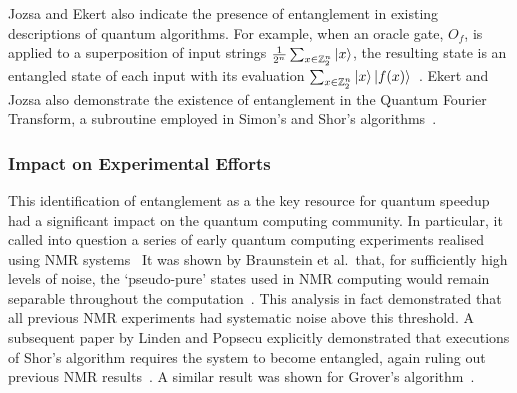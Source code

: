 \documentclass{standalone}
\begin{document}
\par
Jozsa and Ekert also indicate the presence of entanglement in existing descriptions of quantum algorithms. For example, when an oracle gate, $O_{f}$, is applied to a superposition of input strings $\frac{1}{2^{n}}\sum_{x\in\mathbb{Z}_{2}^{n}}\ket{x}$, the resulting state is an entangled state of each input with its evaluation $\sum_{x\in\mathbb{Z}_{2}^{n}}\ket{x}\ket{f(x)}$~\cite{Jozsa1997}. Ekert and Jozsa also demonstrate the existence of entanglement in the Quantum Fourier Transform, a subroutine employed in Simon's and Shor's algorithms~\cite{Ekert1998}.

\subsubsection*{Impact on Experimental Efforts}
This identification of entanglement as a the key resource for quantum speedup had a significant impact on the quantum computing community. In particular, it called into question a series of early quantum computing experiments realised using NMR systems~\cite{Braunstein1999,Linden2001} It was shown by Braunstein et al.\ that, for sufficiently high levels of noise, the `pseudo-pure' states used in NMR computing would remain separable throughout the computation~\cite{Braunstein1999}. This analysis in fact demonstrated that all previous NMR experiments had systematic noise above this threshold. A subsequent paper by Linden and Popsecu explicitly demonstrated that executions of Shor's algorithm requires the system to become entangled, again ruling out previous NMR results~\cite{Linden2001}. A similar result was shown for Grover's algorithm~\cite{Braunstein2001}.
\end{document}
